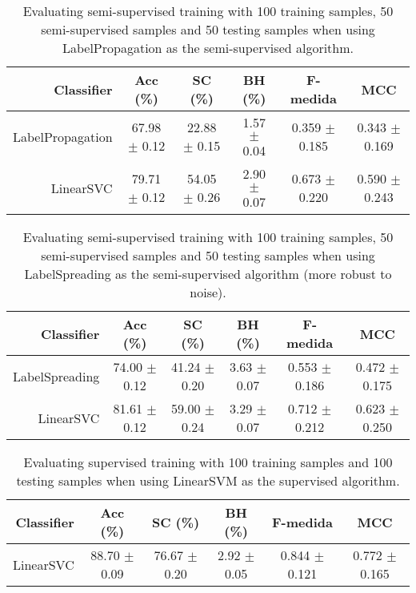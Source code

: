 \begin{table}[!htb]
\footnotesize
\centering
\caption{Evaluating semi-supervised training with 100 training samples, 50 semi-supervised samples and 50 testing samples when using LabelPropagation as the semi-supervised algorithm.}
\label{tab:label-propagation-KatyPerry_CevxZvSJLk8}
\begin{tabular}{r|c|c|c|c|c}
\hline\hline
Classifier & Acc (\%) & SC (\%) & BH (\%) & F-medida & MCC \\ \hline
LabelPropagation & 67.98 $\pm$ 0.12 & 22.88 $\pm$ 0.15 & 1.57 $\pm$ 0.04 & 0.359 $\pm$ 0.185 & 0.343 $\pm$ 0.169 \\
LinearSVC & 79.71 $\pm$ 0.12 & 54.05 $\pm$ 0.26 & 2.90 $\pm$ 0.07 & 0.673 $\pm$ 0.220 & 0.590 $\pm$ 0.243 \\
\hline\hline
\end{tabular}
\end{table}
\begin{table}[!htb]
\footnotesize
\centering
\caption{Evaluating semi-supervised training with 100 training samples, 50 semi-supervised samples and 50 testing samples when using LabelSpreading as the semi-supervised algorithm (more robust to noise).}
\label{tab:label-spreading-KatyPerry_CevxZvSJLk8}
\begin{tabular}{r|c|c|c|c|c}
\hline\hline
Classifier & Acc (\%) & SC (\%) & BH (\%) & F-medida & MCC \\ \hline
LabelSpreading & 74.00 $\pm$ 0.12 & 41.24 $\pm$ 0.20 & 3.63 $\pm$ 0.07 & 0.553 $\pm$ 0.186 & 0.472 $\pm$ 0.175 \\
LinearSVC & 81.61 $\pm$ 0.12 & 59.00 $\pm$ 0.24 & 3.29 $\pm$ 0.07 & 0.712 $\pm$ 0.212 & 0.623 $\pm$ 0.250 \\
\hline\hline
\end{tabular}
\end{table}
\begin{table}[!htb]
\footnotesize
\centering
\caption{Evaluating supervised training with 100 training samples and 100 testing samples when using LinearSVM as the supervised algorithm.}
\label{tab:linear-svm-KatyPerry_CevxZvSJLk8}
\begin{tabular}{r|c|c|c|c|c}
\hline\hline
Classifier & Acc (\%) & SC (\%) & BH (\%) & F-medida & MCC \\ \hline
LinearSVC & 88.70 $\pm$ 0.09 & 76.67 $\pm$ 0.20 & 2.92 $\pm$ 0.05 & 0.844 $\pm$ 0.121 & 0.772 $\pm$ 0.165 \\
\hline\hline
\end{tabular}
\end{table}
